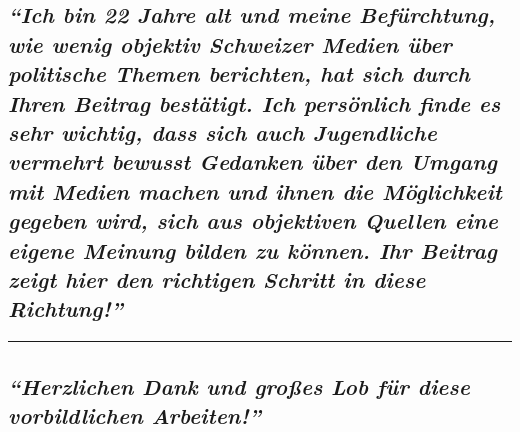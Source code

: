 \hypertarget{ich-bin-22-jahre-alt-und-meine-befuxfcrchtung-wie-wenig-objektiv-schweizer-medien-uxfcber-politische-themen-berichten-hat-sich-durch-ihren-beitrag-bestuxe4tigt-ich-persuxf6nlich-finde-es-sehr-wichtig-dass-sich-auch-jugendliche-vermehrt-bewusst-gedanken-uxfcber-den-umgang-mit-medien-machen-und-ihnen-die-muxf6glichkeit-gegeben-wird-sich-aus-objektiven-quellen-eine-eigene-meinung-bilden-zu-kuxf6nnen-ihr-beitrag-zeigt-hier-den-richtigen-schritt-in-diese-richtung}{%
\subsection{\texorpdfstring{\emph{``Ich bin 22 Jahre alt und meine
Befürchtung, wie wenig objektiv Schweizer Medien über politische Themen
berichten, hat sich durch Ihren Beitrag bestätigt. Ich persönlich finde
es sehr wichtig, dass sich auch Jugendliche vermehrt bewusst Gedanken
über den Umgang mit Medien machen und ihnen die Möglichkeit gegeben
wird, sich aus objektiven Quellen eine eigene Meinung bilden zu können.
Ihr Beitrag zeigt hier den richtigen Schritt in diese
Richtung!''}}{``Ich bin 22 Jahre alt und meine Befürchtung, wie wenig objektiv Schweizer Medien über politische Themen berichten, hat sich durch Ihren Beitrag bestätigt. Ich persönlich finde es sehr wichtig, dass sich auch Jugendliche vermehrt bewusst Gedanken über den Umgang mit Medien machen und ihnen die Möglichkeit gegeben wird, sich aus objektiven Quellen eine eigene Meinung bilden zu können. Ihr Beitrag zeigt hier den richtigen Schritt in diese Richtung!''}}\label{ich-bin-22-jahre-alt-und-meine-befuxfcrchtung-wie-wenig-objektiv-schweizer-medien-uxfcber-politische-themen-berichten-hat-sich-durch-ihren-beitrag-bestuxe4tigt-ich-persuxf6nlich-finde-es-sehr-wichtig-dass-sich-auch-jugendliche-vermehrt-bewusst-gedanken-uxfcber-den-umgang-mit-medien-machen-und-ihnen-die-muxf6glichkeit-gegeben-wird-sich-aus-objektiven-quellen-eine-eigene-meinung-bilden-zu-kuxf6nnen-ihr-beitrag-zeigt-hier-den-richtigen-schritt-in-diese-richtung}}

\begin{center}\rule{0.5\linewidth}{\linethickness}\end{center}

\hypertarget{herzlichen-dank-und-grouxdfes-lob-fuxfcr-diese-vorbildlichen-arbeiten}{%
\subsection{\texorpdfstring{\emph{``Herzlichen Dank und großes Lob für
diese vorbildlichen
Arbeiten!''}}{``Herzlichen Dank und großes Lob für diese vorbildlichen Arbeiten!''}}\label{herzlichen-dank-und-grouxdfes-lob-fuxfcr-diese-vorbildlichen-arbeiten}}

